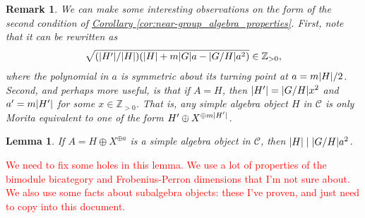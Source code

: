 \documentclass[12pt, reqno]{amsart}
\numberwithin{equation}{section}
\theoremstyle{plainspace}
\newtheorem{lemma}[theorem]{Lemma}
\theoremstyle{definitionspace}
\theoremstyle{remarkspace}
\newtheorem{remark}[theorem]{Remark}
\DeclarePairedDelimiter{\abs}{\lvert}{\rvert}
\newcommand{\mathcat}[1]{\mathcal{#1}}
\begin{document}
\begin{remark}\label{rem:near-group_algebra_properties}
\noindent We can make some interesting observations on the form of the second condition of \hyperref[cor:near-group_algebra_properties]{Corollary \ref*{cor:near-group_algebra_properties}}. First, note that it can be rewritten as
\begin{align*}
\begin{split}
\sqrt{(\abs{H'}/\abs{H})(\abs{H} + m\abs{G}a - \abs{G/H}a^2)} \in \mathbb{Z}_{>0},
\end{split}
\end{align*}
\noindent where the polynomial in $a$ is symmetric about its turning point at $a = m\abs{H}/2$. Second, and perhaps more useful, is that if $A = H$, then $\abs{H'} = \abs{G/H}x^2$ and $a' = m\abs{H'}$ for some $x \in \mathbb{Z}_{>0}$. That is, any simple algebra object $H$ in $\mathcat{C}$ is only Morita equivalent to one of the form $H' \oplus X^{\oplus m\abs{H'}}$.
\end{remark}
\leavevmode

\begin{lemma}\label{lem:near-group_algebra_algebraic_integer}
If $A = H \oplus X^{\oplus a}$ is a simple algebra object in $\mathcat{C}$, then $\abs{H} \mid \abs{G/H}a^2$.
\end{lemma}
\leavevmode

\noindent \textcolor{red}{We need to fix some holes in this lemma. We use a lot of properties of the bimodule bicategory and Frobenius-Perron dimensions that I'm not sure about. We also use some facts about subalgebra objects: these I've proven, and just need to copy into this document.}
\newline
\end{document}
